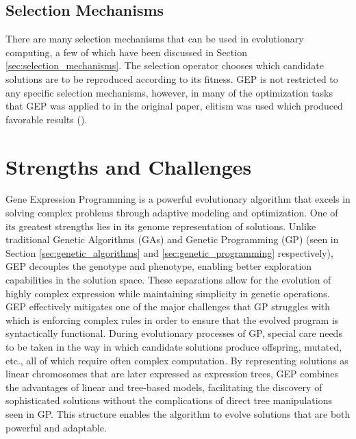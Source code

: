 \subsection{Selection Mechanisms}
There are many selection mechanisms that can be used in evolutionary computing, a few of which have been discussed in Section \ref{sec:selection_mechanisms}. The selection operator chooses which candidate solutions are to be reproduced according to its fitness. GEP is not restricted to any specific selection mechanisms, however, in many of the optimization tasks that GEP was applied to in the original paper, elitism was used which produced favorable results (\cite{ferreira2006gene}).

\section{Strengths and Challenges}\label{sec:gep_strenght_challenges}
Gene Expression Programming is a powerful evolutionary algorithm that excels in solving complex problems through adaptive modeling and optimization. One of its greatest strengths lies in its genome representation of solutions. Unlike traditional Genetic Algorithms (GAs) and Genetic Programming (GP) (seen in Section \ref{sec:genetic_algorithms} and \ref{sec:genetic_programming} respectively), GEP decouples the genotype and phenotype, enabling better exploration capabilities in the solution space.  These separations allow for the evolution of highly complex expression while maintaining simplicity in genetic operations. GEP effectively mitigates one of the major challenges that GP struggles with which is enforcing complex rules in order to ensure that the evolved program is syntactically functional. During evolutionary processes of GP, special care needs to be taken in the way in which candidate solutions produce offspring, mutated, etc., all of which require often complex computation. By representing solutions as linear chromosomes that are later expressed as expression trees, GEP combines the advantages of linear and tree-based models, facilitating the discovery of sophisticated solutions without the complications of direct tree manipulations seen in GP. This structure enables the algorithm to evolve solutions that are both powerful and adaptable. \bigskip


